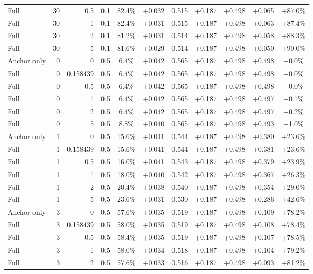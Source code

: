 \begin{table}[htbp]
\begin{tabular}{lrrrccccccc}
Full & 30 & 0.5 & 0.1 & 82.4\% & +0.032 & 0.515 & +0.187 & +0.498 & +0.065 & +87.0\% \\
Full & 30 & 1 & 0.1 & 82.4\% & +0.031 & 0.515 & +0.187 & +0.498 & +0.063 & +87.4\% \\
Full & 30 & 2 & 0.1 & 81.2\% & +0.031 & 0.514 & +0.187 & +0.498 & +0.058 & +88.3\% \\
Full & 30 & 5 & 0.1 & 81.6\% & +0.029 & 0.514 & +0.187 & +0.498 & +0.050 & +90.0\% \\
Anchor only & 0 & 0 & 0.5 & 6.4\% & +0.042 & 0.565 & +0.187 & +0.498 & +0.498 & +0.0\% \\
Full & 0 & 0.158439 & 0.5 & 6.4\% & +0.042 & 0.565 & +0.187 & +0.498 & +0.498 & +0.0\% \\
Full & 0 & 0.5 & 0.5 & 6.4\% & +0.042 & 0.565 & +0.187 & +0.498 & +0.498 & +0.0\% \\
Full & 0 & 1 & 0.5 & 6.4\% & +0.042 & 0.565 & +0.187 & +0.498 & +0.497 & +0.1\% \\
Full & 0 & 2 & 0.5 & 6.4\% & +0.042 & 0.565 & +0.187 & +0.498 & +0.497 & +0.2\% \\
Full & 0 & 5 & 0.5 & 8.8\% & +0.040 & 0.565 & +0.187 & +0.498 & +0.493 & +1.0\% \\
Anchor only & 1 & 0 & 0.5 & 15.6\% & +0.041 & 0.544 & +0.187 & +0.498 & +0.380 & +23.6\% \\
Full & 1 & 0.158439 & 0.5 & 15.6\% & +0.041 & 0.544 & +0.187 & +0.498 & +0.381 & +23.6\% \\
Full & 1 & 0.5 & 0.5 & 16.0\% & +0.041 & 0.543 & +0.187 & +0.498 & +0.379 & +23.9\% \\
Full & 1 & 1 & 0.5 & 18.0\% & +0.040 & 0.542 & +0.187 & +0.498 & +0.367 & +26.3\% \\
Full & 1 & 2 & 0.5 & 20.4\% & +0.038 & 0.540 & +0.187 & +0.498 & +0.354 & +29.0\% \\
Full & 1 & 5 & 0.5 & 23.6\% & +0.031 & 0.530 & +0.187 & +0.498 & +0.286 & +42.6\% \\
Anchor only & 3 & 0 & 0.5 & 57.6\% & +0.035 & 0.519 & +0.187 & +0.498 & +0.109 & +78.2\% \\
Full & 3 & 0.158439 & 0.5 & 58.0\% & +0.035 & 0.519 & +0.187 & +0.498 & +0.108 & +78.4\% \\
Full & 3 & 0.5 & 0.5 & 58.4\% & +0.035 & 0.519 & +0.187 & +0.498 & +0.107 & +78.5\% \\
Full & 3 & 1 & 0.5 & 58.0\% & +0.034 & 0.518 & +0.187 & +0.498 & +0.104 & +79.2\% \\
Full & 3 & 2 & 0.5 & 57.6\% & +0.033 & 0.516 & +0.187 & +0.498 & +0.093 & +81.2\% \\

\end{tabular}
\end{table}
